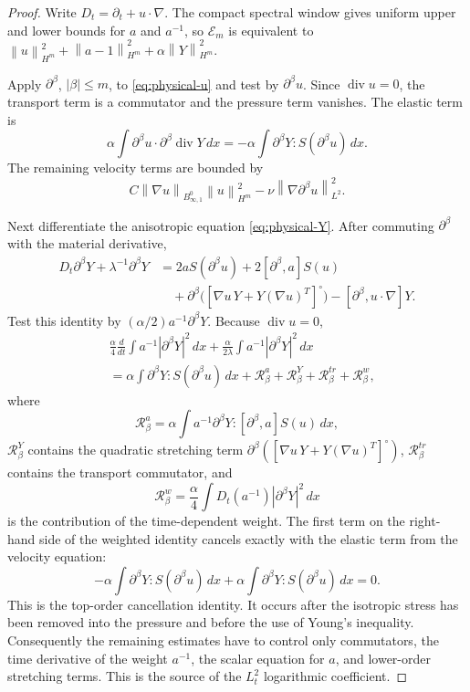 \documentclass[11pt]{article}
\newcommand{\divv}{\operatorname{div}}
\newcommand{\calE}{\mathcal E}
\newcommand{\calR}{\mathcal R}
\newcommand{\norm}[1]{\left\lVert #1\right\rVert}
\newcommand{\Besov}{B^0_{\infty,1}}
\begin{document}
\begin{proof}
Write \(D_t=\partial_t+u\cdot\nabla\).  The compact spectral window gives
uniform upper and lower bounds for \(a\) and \(a^{-1}\), so \(\calE_m\) is
equivalent to
\(\norm{u}_{H^m}^2+\norm{a-1}_{H^m}^2+\alpha\norm{Y}_{H^m}^2\).

Apply \(\partial^\beta\), \(|\beta|\le m\), to
\eqref{eq:physical-u} and test by \(\partial^\beta u\).  Since \(\divv u=0\),
the transport term is a commutator and the pressure term vanishes.  The elastic
term is
\[
  \alpha\int \partial^\beta u\cdot\partial^\beta\divv Y\,dx
  =-\alpha\int \partial^\beta Y:S(\partial^\beta u)\,dx .
  \label{eq:principal-velocity-coupling}
\]
The remaining velocity terms are bounded by
\[
  C\norm{\nabla u}_{\Besov}\norm{u}_{H^m}^2
  -\nu\norm{\nabla\partial^\beta u}_{L^2}^2 .
\]

Next differentiate the anisotropic equation \eqref{eq:physical-Y}.  After
commuting \(\partial^\beta\) with the material derivative,
\[
\begin{aligned}
  D_t\partial^\beta Y+\lambda^{-1}\partial^\beta Y
  &=2aS(\partial^\beta u)
    +2[\partial^\beta,a]S(u)  \\
  &\quad+\partial^\beta\bigl([
      \nabla u\,Y+Y(\nabla u)^T]^\circ\bigr)
    -[\partial^\beta,u\cdot\nabla]Y .
\end{aligned}
\]
Test this identity by \((\alpha/2)a^{-1}\partial^\beta Y\).  Because
\(\divv u=0\),
\[
\begin{aligned}
  &\frac{\alpha}{4}\frac{d}{dt}\int a^{-1}|\partial^\beta Y|^2\,dx
  +\frac{\alpha}{2\lambda}\int a^{-1}|\partial^\beta Y|^2\,dx  \\
  &=\alpha\int \partial^\beta Y:S(\partial^\beta u)\,dx
    +\calR_\beta^{a}+\calR_\beta^{Y}
    +\calR_\beta^{tr}+\calR_\beta^{w},
\end{aligned}
\label{eq:weighted-Y-identity}
\]
where
\[
  \calR_\beta^{a}
  =\alpha\int a^{-1}\partial^\beta Y:
  [\partial^\beta,a]S(u)\,dx,
\]
\(\calR_\beta^Y\) contains the quadratic stretching term
\(\partial^\beta([\nabla u\,Y+Y(\nabla u)^T]^\circ)\),
\(\calR_\beta^{tr}\) contains the transport commutator, and
\[
  \calR_\beta^{w}
  =\frac{\alpha}{4}\int D_t(a^{-1})|\partial^\beta Y|^2\,dx
\]
is the contribution of the time-dependent weight.  The first term on the right-hand side of the weighted identity cancels exactly
with the elastic term from the velocity equation:
\[
  -\alpha\int \partial^\beta Y:S(\partial^\beta u)\,dx
  +\alpha\int \partial^\beta Y:S(\partial^\beta u)\,dx=0.
\]
This is the top-order cancellation identity.  It occurs after the isotropic
stress has been removed into the pressure and before the use of Young's
inequality.  Consequently the remaining estimates have to control only
commutators, the time derivative of the weight \(a^{-1}\), the scalar equation
for \(a\), and lower-order stretching terms.  This is the source of the
\(L^2_t\) logarithmic coefficient.


\end{proof}
\end{document}
